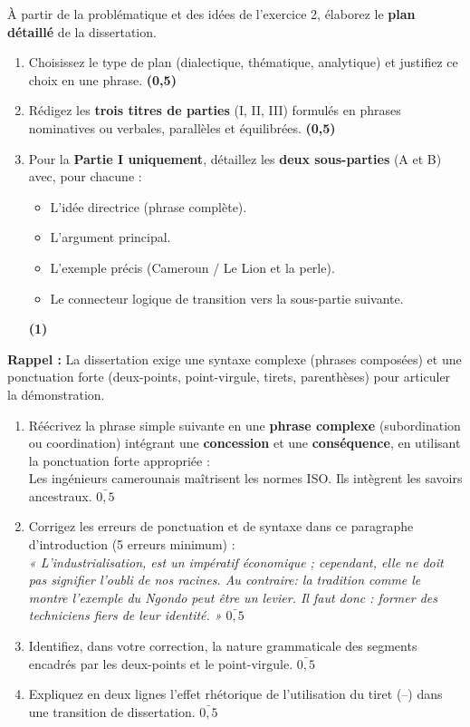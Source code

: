 \documentclass[11pt]{article}
\begin{document}
\begin{exercice}
À partir de la problématique et des idées de l'exercice 2, élaborez le \textbf{plan détaillé} de la dissertation. 

\begin{enumerate}
    \item Choisissez le type de plan (dialectique, thématique, analytique) et justifiez ce choix en une phrase. \textbf{(0,5)}
    \item Rédigez les \textbf{trois titres de parties} (I, II, III) formulés en phrases nominatives ou verbales, parallèles et équilibrées. \textbf{(0,5)}
    \item Pour la \textbf{Partie I uniquement}, détaillez les \textbf{deux sous-parties} (A et B) avec, pour chacune : 
    \begin{itemize}
        \item L'idée directrice (phrase complète).
        \item L'argument principal.
        \item L'exemple précis (Cameroun / Le Lion et la perle).
        \item Le connecteur logique de transition vers la sous-partie suivante.
    \end{itemize}
    \textbf{(1)}
\end{enumerate}
\end{exercice}

\begin{exercice}
\textbf{Rappel :} La dissertation exige une syntaxe complexe (phrases composées) et une ponctuation forte (deux-points, point-virgule, tirets, parenthèses) pour articuler la démonstration.

\begin{enumerate}
    \item Réécrivez la phrase simple suivante en une \textbf{phrase complexe} (subordination ou coordination) intégrant une \textbf{concession} et une \textbf{conséquence}, en utilisant la ponctuation forte appropriée : \\
    \og Les ingénieurs camerounais maîtrisent les normes ISO. Ils intègrent les savoirs ancestraux. \fg{} $\bar{0,5}$
    \item Corrigez les erreurs de ponctuation et de syntaxe dans ce paragraphe d'introduction (5 erreurs minimum) : \\
    \textit{« L'industrialisation, est un impératif économique ; cependant, elle ne doit pas signifier l'oubli de nos racines. Au contraire: la tradition comme le montre l'exemple du Ngondo peut être un levier. Il faut donc : former des techniciens fiers de leur identité. »} $\bar{0,5}$
    \item Identifiez, dans votre correction, la nature grammaticale des segments encadrés par les deux-points et le point-virgule. $\bar{0,5}$
    \item Expliquez en deux lignes l'effet rhétorique de l'utilisation du tiret (--) dans une transition de dissertation. $\bar{0,5}$
\end{enumerate}
\end{exercice}
\end{document}
